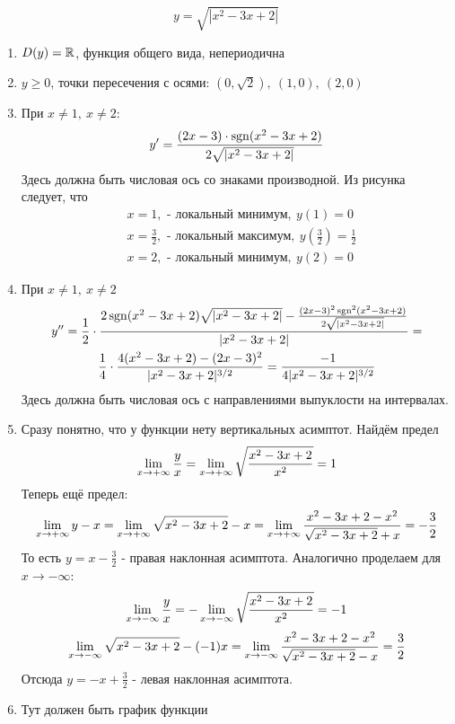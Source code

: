 \begin{example}
	\[
		y = \sqrt{|x^2 - 3x + 2|}
	\]
	\begin{enumerate}
		\item $D(y) = \mathbb{R}$, функция общего вида, непериодична
		
		\item $y \ge 0$, точки пересечения с осями: $(0, \sqrt{2}),\ (1, 0),\ (2, 0)$
		
		\item При $x \neq 1,\ x \neq 2$:
		\[
			y' = \frac{(2x - 3) \cdot \operatorname{sgn} (x^2 - 3x + 2)}{2 \sqrt{|x^2 - 3x + 2|}}
		\]
		Здесь должна быть числовая ось со знаками производной. Из рисунка следует, что
		\begin{align*}
			&{x = 1, \text{ - локальный минимум},\ y(1) = 0}
			\\
			&{x = \frac{3}{2}, \text{ - локальный максимум},\ y\left(\frac{3}{2}\right) = \frac{1}{2}}
			\\
			&{x = 2, \text{ - локальный минимум},\ y(2) = 0}
		\end{align*}
		\item При $x \neq 1,\ x \neq 2$
		\begin{multline*}
			y'' = \frac{1}{2} \cdot \frac{2 \operatorname{sgn} (x^2 - 3x + 2) \sqrt{|x^2 - 3x + 2|} - \frac{(2x - 3)^2 \operatorname{sgn}^2 (x^2 - 3x + 2)}{2 \sqrt{|x^2 - 3x + 2|}}}{|x^2 - 3x + 2|} =
			\\
			\frac{1}{4} \cdot \frac{4(x^2 - 3x + 2) - (2x - 3)^2}{|x^2 - 3x + 2|^{3/2}} = \frac{-1}{4|x^2 - 3x + 2|^{3/2}}
		\end{multline*}
		Здесь должна быть числовая ось с направлениями выпуклости на интервалах.
		
		\item Сразу понятно, что у функции нету вертикальных асимптот. Найдём предел
		\[
			\lim\limits_{x \to +\infty} \frac{y}{x} = \lim\limits_{x \to +\infty} \sqrt{\frac{x^2 - 3x + 2}{x^2}} = 1
		\]
		Теперь ещё предел:
		\[
			\lim\limits_{x \to +\infty} y - x = \lim\limits_{x \to +\infty} \sqrt{x^2 - 3x + 2} - x = \lim\limits_{x \to +\infty} \frac{x^2 - 3x + 2 - x^2}{\sqrt{x^2 - 3x + 2} + x} = -\frac{3}{2}
		\]
		То есть $y = x - \frac{3}{2}$ - правая наклонная асимптота.
		Аналогично проделаем для $x \to -\infty$:
		\[
			\lim\limits_{x \to -\infty} \frac{y}{x} = -\lim\limits_{x \to -\infty} \sqrt{\frac{x^2 - 3x + 2}{x^2}} = -1
		\]
		\[
			\lim\limits_{x \to -\infty} \sqrt{x^2 - 3x + 2} - (-1)x = \lim\limits_{x \to -\infty} \frac{x^2 - 3x + 2 - x^2}{\sqrt{x^2 - 3x + 2} - x} = \frac{3}{2}
		\]
		Отсюда $y = -x + \frac{3}{2}$ - левая наклонная асимптота.
		
		\item Тут должен быть график функции %
	\end{enumerate}
\end{example}